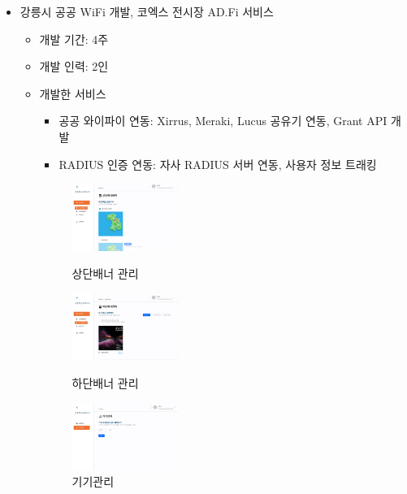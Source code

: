 \begin{itemize}
	\item 강릉시 공공 WiFi 개발, 코엑스 전시장 AD.Fi 서비스
	      \begin{itemize}[label=$\star$]
		      \item 개발 기간: 4주
		      \item 개발 인력: 2인
		      \item 개발한 서비스
		            \begin{itemize}
			            \item 공공 와이파이 연동: Xirrus, Meraki, Lucus 공유기 연동, Grant API 개발
			            \item RADIUS 인증 연동: 자사 RADIUS 서버 연동, 사용자 정보 트래킹
		            \end{itemize}
		            \begin{figure}[!ht]
			            \begin{fullwidth}
				            \parbox{0.35\textwidth}{
					            \centering
					            \includegraphics[width=0.35\textwidth]{images/public-ad-fi-upper-banner.png}
					            \caption*{상단배너 관리}
				            }\qquad
				            \parbox{0.35\textwidth}{
					            \centering
					            \includegraphics[width=0.35\textwidth]{images/public-ad-fi-lower-banner.png}
					            \caption*{하단배너 관리}
				            }\qquad
				            \parbox{0.35\textwidth}{
					            \centering
					            \includegraphics[width=0.35\textwidth]{images/public-ad-fi-device-manage.png}
					            \caption*{기기관리}
}
\end{fullwidth}
\end{figure}
\end{itemize}
\end{itemize}
